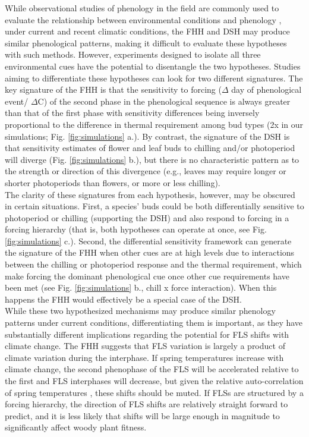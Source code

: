 \documentclass[12pt]{article}\usepackage[]{graphicx}\usepackage[]{color}
\begin{document}
\noindent While observational studies of phenology in the field are commonly used to evaluate the relationship between environmental conditions and phenology \citep{Cleland2007}, under current and recent climatic conditions, the FHH and DSH may produce similar phenological patterns, making it difficult to evaluate these hypotheses with such methods. However, experiments designed to isolate all three environmental cues have the potential to disentangle the two hypotheses. Studies aiming to differentiate these hypotheses can look for two different signatures. The key signature of the FHH is that the sensitivity to forcing ($\Delta$ day of phenological event/ $\Delta$\degree C) of the second phase in the phenological sequence is always greater than that of the first phase with sensitivity differences being inversely proportional to the difference in thermal requirement among bud types (2x in our simulations; Fig. \ref{fig:simulations} a.). By contrast, the signature of the DSH is that sensitivity estimates of flower and leaf buds to chilling and/or photoperiod will diverge (Fig. \ref{fig:simulations} b.), but there is no characteristic pattern as to the strength or direction of this divergence (e.g., leaves may require longer or shorter photoperiods than flowers, or more or less chilling).\\


\noindent The clarity of these signatures from each hypothesis, however, may be obscured in certain situations. First, a species' buds could be both differentially sensitive to photoperiod or chilling (supporting the DSH) and also respond to forcing in a forcing hierarchy (that is, both hypotheses can operate at once, see Fig. \ref{fig:simulations} c.). Second, the differential sensitivity framework can generate the signature of the FHH when other cues are at high levels due to interactions between the chilling or photoperiod response and the thermal requirement, which make forcing the dominant phenological cue once other cue requirements have been met (see Fig. \ref{fig:simulations} b., chill x force interaction). When this happens the FHH would effectively be a special case of the DSH.\\ 

\noident While these two hypothesized mechanisms may produce similar phenology patterns under current conditions, differentiating them %
is important, as they have substantially different implications regarding the potential for FLS shifts with climate change. The FHH suggests that FLS variation is largely a product of climate variation during the interphase. If spring temperatures increase with climate change, the second phenophase of the FLS will be accelerated relative to the first and FLS interphases will decrease, but given the relative auto-correlation of spring temperatures \citep{Di-Cecco:2018aa}, these shifts should be muted. If FLSs are structured by a forcing hierarchy, the direction of FLS shifts are relatively straight forward to predict, and it is less likely that shifts will be large enough in magnitude to significantly affect woody plant fitness.\\
\end{document}
